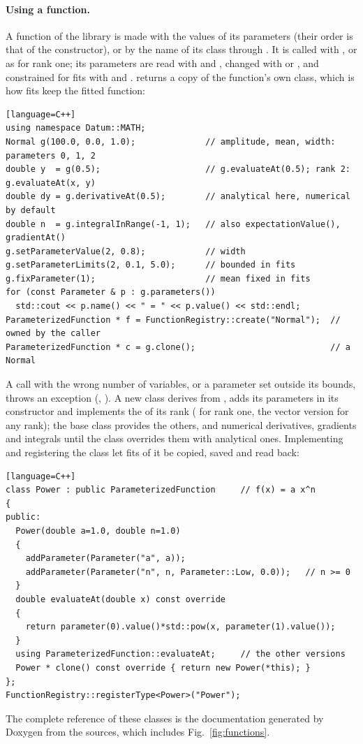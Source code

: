 \paragraph{Using a function.}
A function of the library is made with the values of its parameters (their order is that of the constructor), or
by the name of its class through . It is called with , or as  for
rank one; its parameters are read with  and , changed with
 or , and constrained for fits with 
and .  returns a copy of the function's own class, which is how
fits keep the fitted function:
\begin{widetext}
\begin{verbatim}[language=C++]
using namespace Datum::MATH;
Normal g(100.0, 0.0, 1.0);              // amplitude, mean, width: parameters 0, 1, 2
double y  = g(0.5);                     // g.evaluateAt(0.5); rank 2: g.evaluateAt(x, y)
double dy = g.derivativeAt(0.5);        // analytical here, numerical by default
double n  = g.integralInRange(-1, 1);   // also expectationValue(), gradientAt()
g.setParameterValue(2, 0.8);            // width
g.setParameterLimits(2, 0.1, 5.0);      // bounded in fits
g.fixParameter(1);                      // mean fixed in fits
for (const Parameter & p : g.parameters())
  std::cout << p.name() << " = " << p.value() << std::endl;
ParameterizedFunction * f = FunctionRegistry::create("Normal");  // owned by the caller
ParameterizedFunction * c = g.clone();                           // a Normal
\end{verbatim}
\end{widetext}
A call with the wrong number of variables, or a parameter set outside its bounds, throws an exception
(, ). A new class derives from , adds its
parameters in its constructor and implements the  of its rank ( for rank
one, the vector version for any rank); the base class provides the others, and numerical derivatives, gradients and
integrals until the class overrides them with analytical ones. Implementing  and registering the class
let fits of it be copied, saved and read back:
\begin{widetext}
\begin{verbatim}[language=C++]
class Power : public ParameterizedFunction     // f(x) = a x^n
{
public:
  Power(double a=1.0, double n=1.0)
  {
    addParameter(Parameter("a", a));
    addParameter(Parameter("n", n, Parameter::Low, 0.0));   // n >= 0
  }
  double evaluateAt(double x) const override
  {
    return parameter(0).value()*std::pow(x, parameter(1).value());
  }
  using ParameterizedFunction::evaluateAt;     // the other versions
  Power * clone() const override { return new Power(*this); }
};
FunctionRegistry::registerType<Power>("Power");
\end{verbatim}
\end{widetext}
The complete reference of these classes is the documentation generated by Doxygen from the sources, which includes
Fig.~\ref{fig:functions}.

